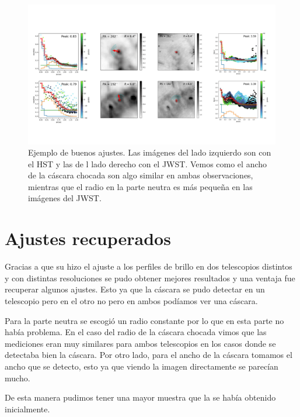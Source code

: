 \documentclass{book}
\begin{document}
\begin{figure}[htb]
    \centering
    \includegraphics[width=1.2\textwidth]{imagenes Chapter 4/ImgFi011-7.pdf}
    \caption{Ejemplo de buenos ajustes. Las imágenes del lado izquierdo son con el HST y las de l lado derecho con el JWST. Vemos como el ancho de la cáscara chocada son algo similar en ambas observaciones, mientras que el radio en la parte neutra es más pequeña en las imágenes del JWST.}
    \label{Goog G}
\end{figure}

\section{Ajustes recuperados}

Gracias a que su hizo el ajuste a los perfiles de brillo en dos telescopios distintos y con distintas resoluciones se pudo obtener mejores resultados y una ventaja fue recuperar algunos ajustes. Esto ya que la cáscara se pudo detectar en un telescopio pero en el otro no pero en ambos podíamos ver una cáscara. 

Para la parte neutra se escogió un radio constante por lo que en esta parte no había problema. En el caso del radio de la cáscara chocada vimos que las mediciones eran muy similares para ambos telescopios en los casos donde se detectaba bien la cáscara. Por otro lado, para el ancho de la cáscara tomamos el ancho que se detecto, esto ya que viendo la imagen directamente se parecían mucho.

De esta manera pudimos tener una mayor muestra que la se había obtenido inicialmente.
\end{document}

